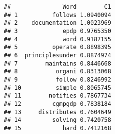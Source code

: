 \documentclass[]{article}
\newenvironment{Shaded}{\begin{snugshade}}{\end{snugshade}}
\newcommand{\KeywordTok}[1]{\textcolor[rgb]{0.13,0.29,0.53}{\textbf{{#1}}}}
\newcommand{\DecValTok}[1]{\textcolor[rgb]{0.00,0.00,0.81}{{#1}}}
\newcommand{\StringTok}[1]{\textcolor[rgb]{0.31,0.60,0.02}{{#1}}}
\newcommand{\NormalTok}[1]{{#1}}
\begin{document}
\begin{Shaded}
\end{Shaded}

\begin{verbatim}
##               Word        C1
## 1          follows 1.0940094
## 2    documentation 1.0023969
## 3             epdp 0.9765350
## 4             word 0.9187155
## 5          operate 0.8898395
## 6  principlesunder 0.8874974
## 7        maintains 0.8446668
## 8           organi 0.8313068
## 9           follow 0.8246992
## 10          simple 0.8065745
## 11        notifies 0.7867734
## 12         cgmpgdp 0.7838184
## 13     distributes 0.7604649
## 14         solving 0.7420758
## 15            hard 0.7412168
\end{verbatim}
\end{document}
